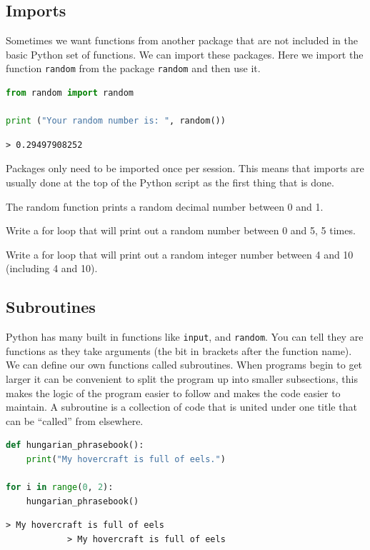 	\subsection{Imports}
		Sometimes we want functions from another package that are not included in the basic Python set of functions. We can import these packages. Here we import the function \texttt{random} from the package \texttt{random} and then use it.
		\begin{lstlisting}[language=Python]
from random import random

print ("Your random number is: ", random())\end{lstlisting}
		\begin{verbatim}> 0.29497908252\end{verbatim}
		Packages only need to be imported once per session. This means that imports are usually done at the top of the Python script as the first thing that is done.
		
		The random function prints a random decimal number between 0 and 1.
		\begin{task}Write a for loop that will print out a random number between 0 and 5, 5 times.\end{task}
		\begin{task}Write a for loop that will print out a random integer number between 4 and 10 (including 4 and 10).\end{task}		

	\subsection{Subroutines}
			Python has many built in functions like \texttt{input}, and \texttt{random}. You can tell they are functions as they take arguments (the bit in brackets after the function name). We can define our own functions called subroutines. When programs begin to get larger it can be convenient to split the program up into smaller subsections, this makes the logic of the program easier to follow and makes the code easier to maintain. A subroutine is a collection of code that is united under one title that can be ``called'' from elsewhere. 
			\begin{lstlisting}[language=Python]
def hungarian_phrasebook():
	print("My hovercraft is full of eels.")

for i in range(0, 2):
	hungarian_phrasebook()\end{lstlisting}
			\begin{verbatim}> My hovercraft is full of eels
			> My hovercraft is full of eels
			\end{verbatim}

